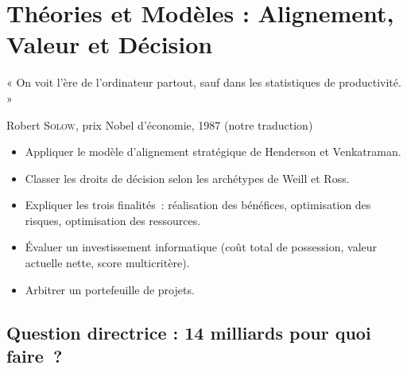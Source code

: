 
\chapter{Théories et Modèles : Alignement, Valeur et Décision}
\label{chap:alignement}

\epigraph{%
    « On voit l'ère de l'ordinateur partout, sauf dans les statistiques
    de productivité. »%
}{Robert \textsc{Solow}, prix Nobel d'économie, 1987 (notre traduction)}


\begin{boxobjectifs}
\begin{itemize}
    \item Appliquer le modèle d'alignement stratégique de Henderson et
          Venkatraman.
    \item Classer les droits de décision selon les archétypes de Weill et
          Ross.
    \item Expliquer les trois finalités~: réalisation des bénéfices,
          optimisation des risques, optimisation des ressources.
    \item Évaluer un investissement informatique (coût total de possession,
          valeur actuelle nette, score multicritère).
    \item Arbitrer un portefeuille de projets.
\end{itemize}
\end{boxobjectifs}

\bigskip

\section*{Question directrice : 14 milliards pour quoi faire~?}

